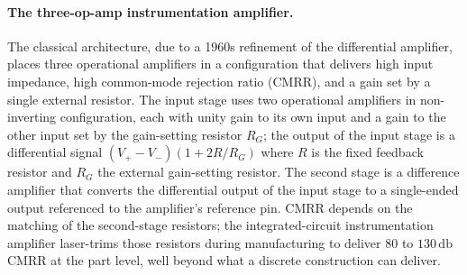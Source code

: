 \paragraph{The three-op-amp instrumentation amplifier.} The classical
architecture, due to a 1960s refinement of the differential
amplifier, places three operational amplifiers in a configuration
that delivers high input impedance, high common-mode rejection ratio
(CMRR), and a gain set by a single external resistor. The input
stage uses two operational amplifiers in non-inverting configuration,
each with unity gain to its own input and a gain to the other input
set by the gain-setting resistor $R_{G}$; the output of the input
stage is a differential signal $(V_{+} - V_{-})(1 + 2R/R_{G})$ where
$R$ is the fixed feedback resistor and $R_{G}$ the external
gain-setting resistor. The second stage is a difference amplifier
that converts the differential output of the input stage to a
single-ended output referenced to the amplifier's reference pin. CMRR depends on
the matching of the second-stage resistors; the integrated-circuit
instrumentation amplifier laser-trims those resistors during
manufacturing to deliver $80$ to $130 \,\si{\decibel}$ CMRR at the
part level, well beyond what a discrete construction can deliver.

